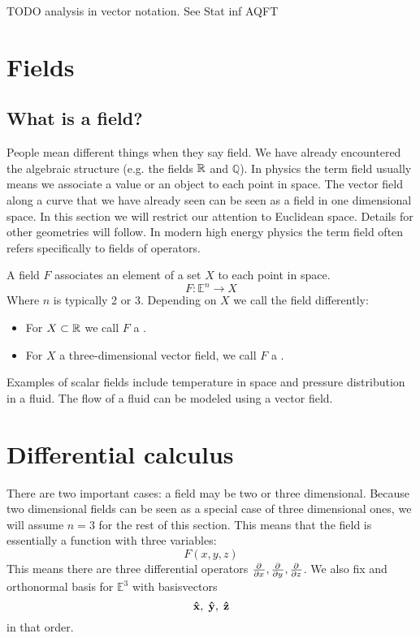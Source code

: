 TODO analysis in vector notation. See Stat inf AQFT

\section{Fields}
\subsection{What is a field?}
People mean different things when they say field. We have already encountered the algebraic structure (e.g. the fields $\mathbb{R}$ and $\mathbb{Q}$). In physics the term field usually means we associate a value or an object to each point in space. The vector field along a curve that we have already seen can be seen as a field in one dimensional space. In this section we will restrict our attention to Euclidean space. Details for other geometries will follow. In modern high energy physics the term field often refers specifically to fields of operators.

\begin{definition}
A field $F$ associates an element of a set $X$ to each point in space.
\[ F: \mathbb{E}^n \to X \]
Where $n$ is typically 2 or 3. Depending on $X$ we call the field differently:
\begin{itemize}
\item For $X \subset \mathbb{R}$ we call $F$ a .
\item For $X$ a three-dimensional vector field, we call $F$ a .
\end{itemize}
\end{definition}

Examples of scalar fields include temperature in space and pressure distribution in a fluid. The flow of a fluid can be modeled using a vector field.

\section{Differential calculus}
There are two important cases: a field may be two or three dimensional. Because two dimensional fields can be seen as a special case of three dimensional ones, we will assume $n=3$ for the rest of this section. This means that the field is essentially a function with three variables:
\[ F(x,y,z) \]
This means there are three differential operators $ \frac{\partial{^{}}}{\partial{{x}^{}}} ,  \frac{\partial{^{}}}{\partial{{y}^{}}} ,  \frac{\partial{^{}}}{\partial{{z}^{}}} $. We also fix and orthonormal basis for $\mathbb{E}^3$ with basisvectors
\[\bm{\mathrm{\hat{x}}},\; \bm{\mathrm{\hat{y}}},\; \bm{\mathrm{\hat{z}}}\]
in that order.

